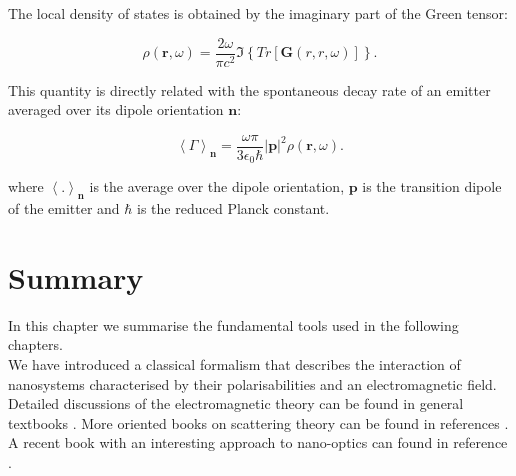 The local density of states is obtained by the imaginary part of the Green tensor:

\begin{equation}
\rho\left(\mathbf{r},\omega\right) = \frac{2\omega}{\pi c^2}\Im{\left\{Tr\left[\mathbf{G}\left(r,r,\omega\right)\right]\right\}}.
\end{equation}

This quantity is directly related with the spontaneous decay rate of an emitter averaged over its dipole orientation $\mathbf{n}$:

\begin{equation}
\left<\Gamma\right>_{\mathbf{n}}=\frac{\omega\pi}{3\epsilon_{0}\hbar}\left|\mathbf{p}\right|^2\rho\left(\mathbf{r},\omega\right).
\end{equation}

where $\left<.\right>_{\mathbf{n}}$ is the average over the dipole orientation, $\mathbf{p}$ is the transition dipole of the emitter and $\hbar$ is the reduced Planck constant.






\section{Summary}

In this chapter we summarise the fundamental tools used in the following chapters.\\ 
We have introduced a classical formalism that describes the interaction of nanosystems characterised by their polarisabilities and an electromagnetic field. \\
Detailed discussions of the electromagnetic theory can be found in general textbooks \cite{Jackson_CE,stratton2007electromagnetic,landau1975classical,born1999principles, van2007electromagnetic}. More oriented books on scattering theory can be found in references \cite{bohren2008absorption, nieto2006scattering,Ping:2006kn}. A recent book with an interesting approach to nano-optics can found in reference \cite{Novotny_PNO_2012}.


%
%
%
%
%
%
%
%
%

